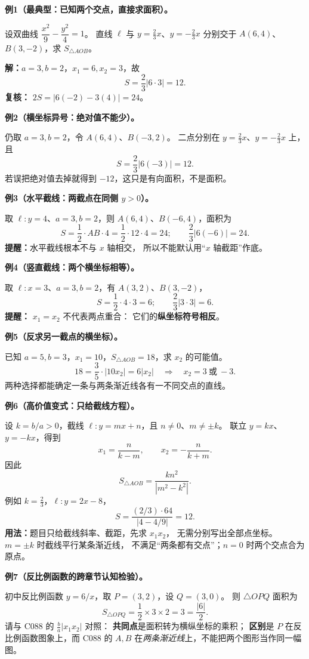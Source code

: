 \clearpage
\begin{examplebox}
\textbf{例1（最典型：已知两个交点，直接求面积）。}

设双曲线 $\dfrac{x^2}{9}-\dfrac{y^2}{4}=1$。
直线 $\ell$ 与 $y=\tfrac23 x$、$y=-\tfrac23x$
分别交于 $A(6,4)$、$B(3,-2)$，求 $S_{\triangle AOB}$。

\textbf{解：}$a=3,b=2$，$x_1=6,x_2=3$，故
\[
\boxed{S=\frac23|6\cdot3|=12}.
\]
\textbf{复核：} $2S=|6(-2)-3(4)|=24$。

\medskip
\textbf{例2（横坐标异号：绝对值不能少）。}

仍取 $a=3,b=2$，令 $A(6,4)$、$B(-3,2)$。
二点分别在 $y=\tfrac23x$、$y=-\tfrac23x$ 上，且
\[
\boxed{S=\frac23|6(-3)|=12}.
\]
若误把绝对值去掉就得到 $-12$，这只是有向面积，不是面积。

\medskip
\textbf{例3（水平截线：两截点在同侧 $y>0$）。}

取 $\ell:y=4$、$a=3,b=2$，则
$A(6,4)$、$B(-6,4)$，面积为
\[
S=\frac12\cdot AB\cdot4=\frac12\cdot12\cdot4=24;
\qquad\boxed{\frac23|6(-6)|=24}.
\]
\textbf{提醒：}水平截线根本不与 $x$ 轴相交，
所以不能默认用“$x$ 轴截距”作底。

\medskip
\textbf{例4（竖直截线：两个横坐标相等）。}

取 $\ell:x=3$、$a=3,b=2$，有 $A(3,2)$、$B(3,-2)$，
\[
S=\frac12\cdot4\cdot3=6;
\qquad\boxed{\frac23|3\cdot3|=6}.
\]
\textbf{提醒：} $x_1=x_2$ 不代表两点重合：
它们的\textbf{纵坐标符号相反}。

\medskip
\end{examplebox}
\clearpage
\begin{examplebox}
\textbf{例5（反求另一截点的横坐标）。}

已知 $a=5,b=3$，$x_1=10$，$S_{\triangle AOB}=18$，求 $x_2$ 的可能值。
\[
18=\frac35\cdot|10x_2|=6|x_2|
\quad\Longrightarrow\quad\boxed{x_2=3\ \text{或}\ -3}.
\]
两种选择都能确定一条与两条渐近线各有一不同交点的直线。

\medskip
\textbf{例6（高价值变式：只给截线方程）。}

设 $k=b/a>0$，截线 $\ell:y=mx+n$，且
$n\ne0$、$m\ne\pm k$。
联立 $y=kx$、$y=-kx$，得到
\[
x_1=\frac{n}{k-m},\qquad x_2=-\frac{n}{k+m}.
\]
因此
\[
\boxed{S_{\triangle AOB}=\frac{k n^2}{|m^2-k^2|}}.
\]
例如 $k=\tfrac23$，$\ell:y=2x-8$，
\[
S=\frac{(2/3)\cdot64}{|4-4/9|}=\boxed{12}.
\]
\textbf{用法：}题目只给截线斜率、截距，先求 $x_1x_2$，
无需分别写出全部点坐标。$m=\pm k$ 时截线平行某条渐近线，
不满足“两条都有交点”；$n=0$ 时两个交点合为原点。

\medskip

\textbf{例7（反比例函数的跨章节认知检验）。}

初中反比例函数 $y=6/x$，取 $P=(3,2)$，设 $Q=(3,0)$。
则 $\triangle OPQ$ 面积为
\[
S_{\triangle OPQ}=\frac12\times3\times2=3=\frac{|6|}{2}.
\]
请与 C088 的 $\frac ba|x_1x_2|$ 对照：
\textbf{共同点}是面积转为横纵坐标的乘积；
\textbf{区别}是 $P$ 在反比例函数图象上，而 C088 的 $A,B$
在\emph{两条渐近线}上，不能把两个图形当作同一幅图。


\end{examplebox}
